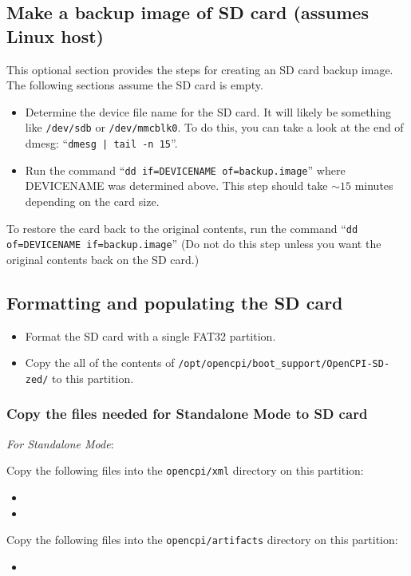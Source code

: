 \subsection*{Make a backup image of SD card (assumes Linux host)}
This optional section provides the steps for creating an SD card backup image. The following sections assume the SD card is empty.
\begin{itemize}
\item Determine the device file name for the SD card. It will likely be something like \texttt{/dev/sdb} or \texttt{/dev/mmcblk0}. To do this, you can take a look at the end of dmesg: ``\texttt{dmesg | tail -n 15}''.
\item Run the command ``\texttt{dd if=DEVICENAME of=backup.image}'' where DEVICENAME was determined above. This step should take $\sim15$ minutes depending on the card size.
\end{itemize}
\noindent To restore the card back to the original contents, run the command ``\texttt{dd of=DEVICENAME if=backup.image}'' (Do not do this step unless you want the original contents back on the SD card.)
\subsection*{Formatting and populating the SD card}
\begin{itemize}
\item Format the SD card with a single FAT32 partition.
\item Copy the all of the contents of \texttt{/opt/opencpi/boot\_support/OpenCPI-SD-zed/} to this partition.
\end{itemize}
\subsubsection*{Copy the files needed for Standalone Mode to SD card}
\textit{For Standalone Mode}:
\begin{itemize}
\begin{minipage}{\linewidth}
 \item Copy the following files into the \texttt{opencpi/xml} directory on this partition:
 \begin{itemize}
   \item {}
   \item {}
 \end{itemize}
 \item Copy the following files into the \texttt{opencpi/artifacts} directory on this partition:
 \begin{itemize}
   \item {}
 \end{itemize}
\end{minipage}
\end{itemize}

